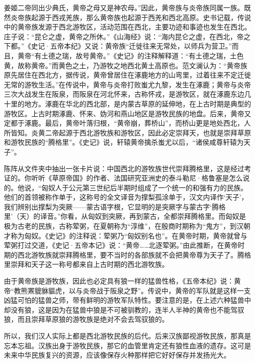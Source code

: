 \par 姜姬二帝同出少典氏，黄帝之母又是神农母。”因此，黄帝族与炎帝族同属一族。既然炎帝族起源于西戎羌族，那么黄帝族也起源于西羌和西北高原。史书记载，传说中的黄帝族发源于西北游牧区，活动范围在西北，主要功迹和事迹也发生在西北。庄子说：“昆仑之虚，黄帝之所休。”《山海经》说：“海内昆仑之虚，在西北，帝之下都。”《史记·五帝本纪》又说：黄帝族“迁徙往来无常处，以师兵为营卫。”而且，黄帝“有土德之瑞，故号黄帝。”《史记》的注释解释道：“有土德之瑞，土色黄，故称黄帝。”而黄色之土，乃游牧之地西北黄土高原也。范文澜认为：“黄帝族原先居住在西北方，据传说，黄帝曾居住在涿鹿地方的山弯里，过着往来不定迁徙无常的游牧生活。”在传说中，黄帝与炎帝打败蚩尤九黎，发生在涿鹿；黄帝与炎帝三次大战发生在阪泉，而阪泉在河北怀来，古称怀戎，是游牧区，就在涿鹿东边几十里的地方。涿鹿在华北的西北部，是内蒙古草原的延伸地，在上古时期是典型的游牧区。上古时期涿鹿、怀来、妫河和燕山地区是游牧民族的地盘。后来，黄帝又定都于涿鹿。最后，黄帝叶落归根，“黄帝崩，葬桥山”，而桥山更是地处西北，人所皆知。炎黄二帝起源于西北游牧族和游牧区，因此必定崇拜天，也就是崇拜草原和游牧民族的“腾格里”。《史记》说，轩辕黄帝擒杀蚩尤以后，“诸侯咸尊轩辕为天子”。
\par 陈阵从文件夹中抽出一张卡片说：中国西北的游牧族世代崇拜腾格里，这是经过考证的。你听听《草原帝国》的作者、法国研究亚洲史的泰斗勒尼·格鲁塞是怎么说的。他说，“匈奴人于公元第三世纪后半期时组成了一个统一的和强有力的民族。他们的首领被称作单于，这称号的全文译音为撑梨孤涂单于，汉文内译作‘天子’，我们辨别出撑梨为突厥——蒙古语字根，它显明的是突厥字与蒙古字‘腾格里’（天）的译音。”你看，从匈奴到突厥，再到蒙古，全都崇拜腾格里。而匈奴是极为古老的民族，古称荤粥，在夏朝称为“淳维”，在殷商时期称为“鬼方”，到汉朝才称为匈奴。《史记》的注释说：荤粥乃“匈奴别名也”。在黄帝时期，黄帝就曾与荤粥打过交道，《史记·五帝本记》说：“黄帝……北逐荤粥。”由此推断，在黄帝时期的西北游牧族就崇拜腾格里，要不当时的各部族就不会把黄帝尊为天子了。腾格里崇拜和天子这一称号都来自上古时期的西北游牧族。
\par 由于黄帝族是游牧族，因此也必定具有狼一样的猛兽性格，《五帝本纪》说：黄帝“教熊罴貔貅貙虎，以与炎帝战于阪泉之野”。传说中，黄帝的军队就是这样一支凶猛可怕的猛兽之师，带有鲜明的游牧军队特性。要注意的是，在上述六种猛兽中却没有狼，这是因为在猛兽中狼是不可被驯教的，连半人半神的黄帝也不能驾驭狼，而且崇拜草原狼的游牧族是绝对不会去驾驭狼的。
\par 所以，我们汉人实际上都是西北游牧民族的后代。后来汉族鄙视游牧民族，那真是忘本忘祖。汉族出身于游牧民族，那它的血管里肯定还有狼性血液的遗存。这可是未来中华民族复兴的资源，应该像保存火种那样把它好好保存并发扬光大。
\par 
